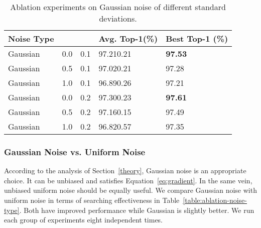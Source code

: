 \documentclass{article}
\begin{document}
\begin{table}[ht]
	\begin{center}
		\caption{Ablation experiments on Gaussian noise of different standard deviations.}
		\label{table:ablation-exps}
		\begin{tabular}{*{5}{l}}
		\toprule
		Noise Type &   &  & Avg. Top-1(\%)  & Best Top-1 (\%)\\
		\midrule
		Gaussian & 0.0 &  0.1 & 97.210.21 & \textbf{97.53} \\ Gaussian & 0.5 &  0.1  & 97.020.21  & 97.28 \\ Gaussian & 1.0 &  0.1 &  96.890.26 & 97.21 \\ \midrule
		Gaussian & 0.0 &  0.2 &97.300.23 & \textbf{97.61} \\ Gaussian & 0.5 &  0.2 & 97.160.15& 97.49 \\ Gaussian & 1.0 &  0.2 & 96.820.57 & 97.35 \\ \bottomrule
		\end{tabular}
	\end{center}
\end{table}


\subsubsection{Gaussian Noise  vs. Uniform Noise}

According to the analysis of Section~\ref{theory}, Gaussian noise is an appropriate choice. It can be unbiased and satisfies Equation~\ref*{eq:gradient}. In the same vein, unbiased uniform noise should be equally useful. We compare Gaussian noise with uniform noise in terms of searching effectiveness in Table~\ref{table:ablation-noise-type}. Both have improved performance while Gaussian is slightly better. We run each group of experiments eight independent times.
\end{document}
